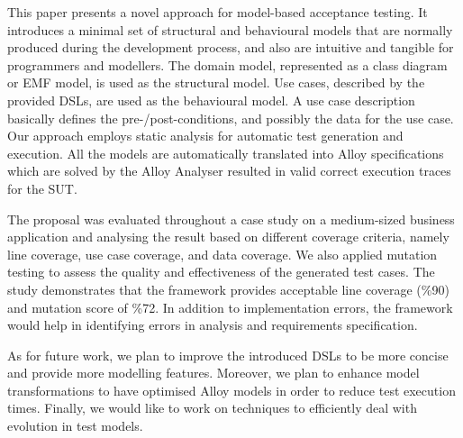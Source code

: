 %
%
This paper presents a novel approach for model-based acceptance testing. It introduces a minimal set of structural and behavioural models that are normally produced during the development process, and also are intuitive and tangible for programmers and modellers. The domain model, represented as a class diagram or EMF model, is used as the structural model. Use cases, described by the provided DSLs, are used as the behavioural model. A use case description basically defines the pre-/post-conditions, and possibly the data for the use case.
Our approach employs static analysis for automatic test generation and execution. All the models are automatically translated into Alloy specifications which are solved by the Alloy Analyser resulted in valid correct execution traces for the SUT.

The proposal was evaluated throughout a case study on a medium-sized business application and analysing the result based on different coverage criteria, namely line coverage, use case coverage, and data coverage. We also applied mutation testing to assess the quality and effectiveness of the generated test cases. The study demonstrates that the framework provides acceptable line coverage (\%90) and mutation score of \%72. In addition to implementation errors, the framework would help in identifying errors in analysis and requirements specification.

As for future work, we plan to improve the introduced DSLs to be more concise and provide more modelling features. Moreover, we plan to enhance model transformations to have optimised Alloy models in order to reduce test execution times. Finally, we would like to work on techniques to efficiently deal with evolution in test models.


